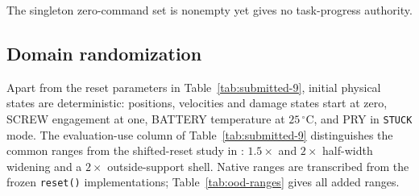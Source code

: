 \documentclass[10pt]{article}
\let\suppsection\suppname
\begin{document}
The singleton zero-command set is nonempty yet gives no task-progress authority.


\subsection{Domain randomization}

Apart from the reset parameters in Table~\ref{tab:submitted-9}, initial
physical states are deterministic: positions, velocities and damage states
start at zero, SCREW engagement at one, BATTERY temperature at $25\,{}^{\circ}$C, and PRY
in \texttt{STUCK} mode. The evaluation-use column of Table~\ref{tab:submitted-9}
distinguishes the common ranges from the shifted-reset study in
\suppsection{S14}: $1.5\times$ and $2\times$ half-width widening and a
$2\times$ outside-support shell. Native ranges are transcribed from the frozen
\texttt{reset()} implementations; Table~\ref{tab:ood-ranges} gives all added
ranges.
\end{document}
